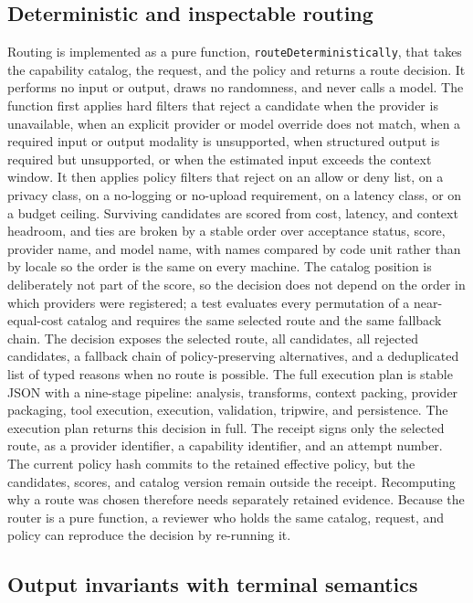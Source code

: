 \documentclass[conference]{IEEEtran}
\newcommand{\code}[1]{\texttt{\small #1}}
\begin{document}
\subsection{Deterministic and inspectable routing}

Routing is implemented as a pure function, \code{routeDeterministically}, that takes
the capability catalog, the request, and the policy and returns a route decision. It
performs no input or output, draws no randomness, and never calls a model. The
function first applies hard filters that reject a candidate when the provider is
unavailable, when an explicit provider or model override does not match, when a
required input or output modality is unsupported, when structured output is required
but unsupported, or when the estimated input exceeds the context window. It then
applies policy filters that reject on an allow or deny list, on a privacy class, on a
no-logging or no-upload requirement, on a latency class, or on a budget ceiling.
Surviving candidates are scored from cost, latency, and context headroom, and ties
are broken by a stable order over acceptance status, score, provider name, and model
name, with names compared by code unit rather than by locale so the order is the same
on every machine. The catalog position is deliberately not part of the score, so the
decision does not depend on the order in which providers were registered; a test evaluates
every permutation of a near-equal-cost catalog and requires the same selected route
and the same fallback chain. The decision exposes the selected route, all candidates, all
rejected candidates, a fallback chain of policy-preserving alternatives, and a
deduplicated list of typed reasons when no route is possible. The full execution plan
is stable JSON with a nine-stage pipeline: analysis, transforms, context packing,
provider packaging, tool execution, execution, validation, tripwire, and persistence.
The execution plan returns this decision in full. The receipt signs only the
selected route, as a provider identifier, a capability identifier, and an attempt
number. The current policy hash commits to the retained effective policy, but the
candidates, scores, and catalog version remain outside the receipt. Recomputing why
a route was chosen therefore needs separately retained evidence. Because the router is a pure
function, a reviewer who holds the same catalog, request, and policy can reproduce the
decision by re-running it.

\subsection{Output invariants with terminal semantics}
\end{document}
